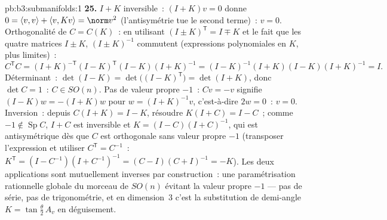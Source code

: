 \begin{solution}{pb:b3:submanifolds:1}
\textbf{25.} $I + K$ inversible~: $(I + K)v = 0$ donne $0 =
\langle v, v\rangle + \langle v, Kv\rangle = \norm v^2$
(l'antisymétrie tue le second terme)~: $v = 0$.
Orthogonalité de $C = C(K)$~: en utilisant $(I \pm
K)^{\mathsf T} = I \mp K$ et le fait que les quatre
matrices $I \pm K$, $(I \pm K)^{-1}$ commutent (expressions
polynomiales en $K$, plus limites)~:
\[
C^{\mathsf T}C = (I + K)^{-\mathsf T}(I - K)^{\mathsf T}
(I - K)(I + K)^{-1}
= (I - K)^{-1}(I + K)(I - K)(I + K)^{-1} = I .
\]
Déterminant~: $\det(I - K) = \det\bigl((I - K)^{\mathsf
T}\bigr) = \det(I + K)$, donc $\det C = 1$~: $C \in
SO(n)$. Pas de valeur propre $-1$~: $Cv = -v$ signifie $(I
- K)w = -(I + K)w$ pour $w = (I + K)^{-1}v$, c'est-à-dire
$2w = 0$~: $v = 0$. Inversion~: depuis $C(I + K) = I - K$,
résoudre $K(I + C) = I - C$~; comme $-1 \notin
\operatorname{Sp}C$, $I + C$ est inversible et $K = (I -
C)(I + C)^{-1}$, qui est antisymétrique dès que $C$ est
orthogonale sans valeur propre $-1$ (transposer
l'expression et utiliser $C^{\mathsf T} = C^{-1}$~:
$K^{\mathsf T} = (I - C^{-1})(I + C^{-1})^{-1} = (C -
I)(C + I)^{-1} = -K$). Les deux applications sont
mutuellement inverses par construction~: une
paramétrisation rationnelle globale du morceau  
de $SO(n)$ évitant la valeur propre $-1$ --- pas de série,
pas de trigonométrie, et en dimension~$3$ c'est la
substitution de demi-angle $K = \tan\frac\theta2\,A_v$ en
déguisement.
\end{solution}
